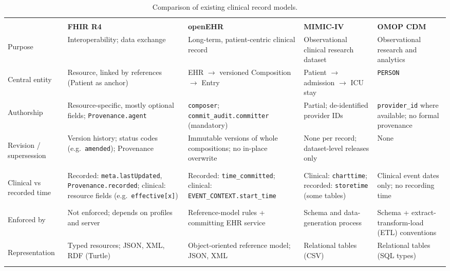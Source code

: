 \documentclass[sigconf]{acmart}
\begin{document}
\begin{table}[t]
\scriptsize
\setlength{\tabcolsep}{4pt}
\caption{Comparison of existing clinical record models.}
\label{tab:comparison}
\vspace{-1em}
\begin{tabularx}{\textwidth}{@{}>{\bfseries\raggedright\arraybackslash}p{2.3cm}*{4}{>{\raggedright\arraybackslash}X}@{}}
\toprule
 & \multicolumn{2}{c}{\textit{Operational / exchange}} & \multicolumn{2}{c}{\textit{Research / analytical}} \\
\cmidrule(lr){2-3}\cmidrule(l){4-5}
 & \textbf{FHIR R4}~\cite{fhir-r4} & \textbf{openEHR}~\cite{openehr-rm} & \textbf{MIMIC-IV}~\cite{mimic-iv} & \textbf{OMOP CDM}~\cite{omop-cdm} \\
\midrule
Purpose &
  Interoperability; data exchange &
  Long-term, patient-centric clinical record &
  Observational clinical research dataset &
  Observational research and analytics \\
Central entity &
  Resource, linked by references (Patient as anchor) &
  EHR $\rightarrow$ versioned Composition $\rightarrow$ Entry &
  Patient $\rightarrow$ admission $\rightarrow$ ICU stay &
  \texttt{PERSON} \\
Authorship &
  Resource-specific, mostly optional fields; \texttt{Provenance.agent} &
  \texttt{composer}; \texttt{commit\_audit.committer} (mandatory) &
  Partial; de-identified provider IDs &
  \texttt{provider\_id} where available; no formal provenance \\
Revision / supersession &
  Version history; status codes (e.g.\ \texttt{amended}); Provenance &
  Immutable versions of whole compositions; no in-place overwrite &
  None per record; dataset-level releases only &
  None \\
Clinical vs recorded time &
  Recorded: \texttt{meta.lastUpdated}, \texttt{Provenance.recorded}; clinical: resource fields (e.g.\ \texttt{effective[x]}) &
  Recorded: \texttt{time\_committed}; clinical: \texttt{EVENT\_CONTEXT.start\_time} &
  Clinical: \texttt{charttime}; recorded: \texttt{storetime} (some tables) &
  Clinical event dates only; no recording time \\
Enforced by &
  Not enforced; depends on profiles and server &
  Reference-model rules + committing EHR service &
  Schema and data-generation process &
  Schema + extract-transform-load (ETL) conventions \\
Representation &
  Typed resources; JSON, XML, RDF (Turtle) &
  Object-oriented reference model; JSON, XML &
  Relational tables (CSV) &
  Relational tables (SQL types) \\
\bottomrule
\end{tabularx}
\vspace{-1em}
\end{table}
\end{document}
